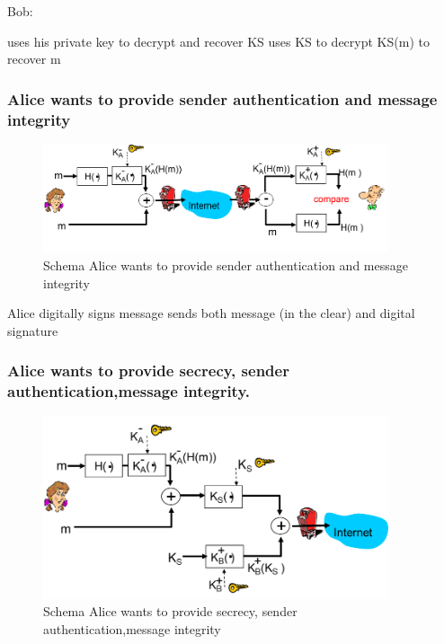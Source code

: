 \noindent Bob:

\bi
\itf uses his private key to decrypt and recover KS
\itf uses KS to decrypt KS(m) to recover m
\ei

\subsubsection{Alice wants to provide sender authentication and message integrity}

\begin{figure}[h]
    \centering
    \includegraphics[width=4in]{./img/imghfdst8/hfdst8puntje24.png}
    \caption{Schema Alice wants to provide sender authentication and message integrity }      
    \label{fig:Schema Alice wants to provide sender authentication and message integrity }
\end{figure}

\bi
\itf Alice digitally signs message
\itf sends both message (in the clear) and digital signature
\ei

\subsubsection{Alice wants to provide secrecy, sender authentication,message integrity.}

\begin{figure}[h]
    \centering
    \includegraphics[width=4in]{./img/imghfdst8/hfdst8puntje25.png}
    \caption{Schema Alice wants to provide secrecy, sender authentication,message integrity }      
    \label{fig:Schema Alice wants to provide secrecy, sender authentication,message integrity }
\end{figure}

